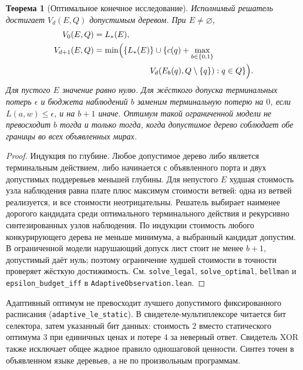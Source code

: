 \documentclass[10pt,a4paper]{article}
\newtheorem{theorem}{Теорема}[section]
\newcommand{\rc}[1]{\allowbreak\texttt{#1}\allowbreak}
\begin{document}
\begin{theorem}[Оптимальное конечное исследование]\label{thm:investigation}
Исполнимый решатель достигает $V_d(E,Q)$ допустимым деревом. При $E\ne\varnothing$,
\begin{align}
 V_0(E,Q)&=L_*(E),\\
 V_{d+1}(E,Q)&=\min\Bigl(\{L_*(E)\}\cup\{c(q)+\max_{b\in\{0,1\}} \\
 &\hspace{24mm} V_d(E_b(q),Q\setminus\{q\}):q\in Q\}\Bigr).
\end{align}
Для пустого $E$ значение равно нулю. Для жёсткого допуска терминальных потерь $\epsilon$ и бюджета наблюдений $b$ заменим терминальную потерю на $0$, если $L(a,w)\le\epsilon$, и на $b+1$ иначе. Оптимум такой ограниченной модели не превосходит $b$ тогда и только тогда, когда допустимое дерево соблюдает обе границы во всех объявленных мирах.
\end{theorem}
\begin{proof}
Индукция по глубине. Любое допустимое дерево либо является терминальным действием, либо начинается с объявленного порта и двух допустимых поддеревьев меньшей глубины. Для непустого $E$ худшая стоимость узла наблюдения равна плате плюс максимум стоимости ветвей: одна из ветвей реализуется, и все стоимости неотрицательны. Решатель выбирает наименее дорогого кандидата среди оптимального терминального действия и рекурсивно синтезированных узлов наблюдения. По индукции стоимость любого конкурирующего дерева не меньше минимума, а выбранный кандидат допустим. В ограниченной модели нарушающий допуск лист стоит не менее $b+1$, допустимый даёт нуль; поэтому ограничение худшей стоимости в точности проверяет жёсткую достижимость. См. \rc{solve\_legal}, \rc{solve\_optimal}, \rc{bellman} и \rc{epsilon\_budget\_iff} в \rc{AdaptiveObservation.lean}.
\end{proof}
Адаптивный оптимум не превосходит лучшего допустимого фиксированного расписания (\rc{adaptive\_le\_static}). В свидетеле-мультиплексоре читается бит селектора, затем указанный бит данных: стоимость $2$ вместо статического оптимума $3$ при единичных ценах и потере $4$ за неверный ответ. Свидетель XOR также исключает общее жадное правило одношаговой ценности. Синтез точен в объявленном языке деревьев, а не по произвольным программам.
\end{document}
